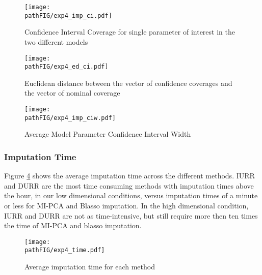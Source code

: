 \begin{figure}
	\centering
	\texttt{[image: \\pathFIG/exp4\_imp\_ci.pdf]}
	\caption{Confidence Interval Coverage for single parameter of interest in the two 
		different models}
	\label{fig:exp4ci}
\end{figure}

\begin{figure}
	\centering
	\texttt{[image: \\pathFIG/exp4\_ed\_ci.pdf]}
	\caption{Euclidean distance between the vector of confidence coverages and the vector of 
		nominal coverage}
	\label{fig:exp4cied}
\end{figure}

\begin{figure}
	\centering
	\texttt{[image: \\pathFIG/exp4\_imp\_ciw.pdf]}
	\caption{Average Model Parameter Confidence Interval Width}
	\label{fig:exp4ciw}
\end{figure}


\subsubsection{Imputation Time}

	Figure \ref{fig:exp4time} shows the average imputation time across the different methods.
	IURR and DURR are the most time consuming methods with imputation times above the hour, 
	in our low dimensional conditions, versus imputation times of a minute or less for MI-PCA and 
	Blasso imputation.
	In the high dimensional condition, IURR and DURR are not as time-intensive, but still 
	require more then ten times the time of MI-PCA and blasso imputation.

\begin{figure}
	\centering
	\texttt{[image: \\pathFIG/exp4\_time.pdf]}
	\caption{Average imputation time for each method}
	\label{fig:exp4time}
\end{figure}

\FloatBarrier


